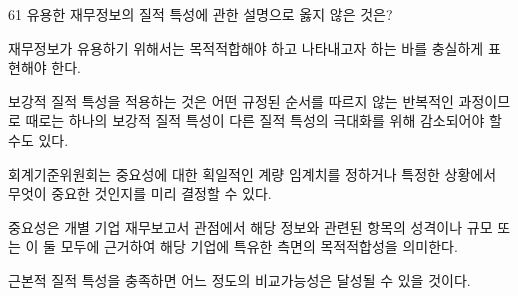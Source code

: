 \begin{question}{61}
유용한 재무정보의 질적 특성에 관한 설명으로 옳지 않은 것은?
\begin{choices}
  \item 재무정보가 유용하기 위해서는 목적적합해야 하고 나타내고자 하는 바를 충실하게 표현해야 한다.
  \item 보강적 질적 특성을 적용하는 것은 어떤 규정된 순서를 따르지 않는 반복적인 과정이므로 때로는 하나의 보강적 질적 특성이 다른 질적 특성의 극대화를 위해 감소되어야 할 수도 있다.
  \item 회계기준위원회는 중요성에 대한 획일적인 계량 임계치를 정하거나 특정한 상황에서 무엇이 중요한 것인지를 미리 결정할 수 있다.
  \item 중요성은 개별 기업 재무보고서 관점에서 해당 정보와 관련된 항목의 성격이나 규모 또는 이 둘 모두에 근거하여 해당 기업에 특유한 측면의 목적적합성을 의미한다.
  \item 근본적 질적 특성을 충족하면 어느 정도의 비교가능성은 달성될 수 있을 것이다.
\end{choices}
\end{question}
